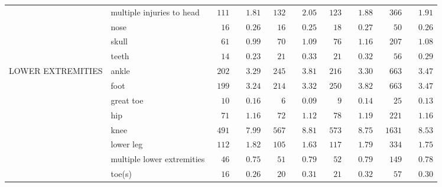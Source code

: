 \documentclass[9pt, oneside]{article}   	%
\begin{document}
\begin{longtable}{p{1.8in}p{2.2in}cccccccc}
 & multiple injuries to head  & $\phantom{0}111$ & $\phantom{00}1.81$ & $\phantom{0}132$ & $\phantom{00}2.05$ & $\phantom{0}123$ & $\phantom{00}1.88$ & $\phantom{00}366$ & $\phantom{00}1.91$ \\
 & nose  & $\phantom{00}16$ & $\phantom{00}0.26$ & $\phantom{00}16$ & $\phantom{00}0.25$ & $\phantom{00}18$ & $\phantom{00}0.27$ & $\phantom{000}50$ & $\phantom{00}0.26$ \\
 & skull  & $\phantom{00}61$ & $\phantom{00}0.99$ & $\phantom{00}70$ & $\phantom{00}1.09$ & $\phantom{00}76$ & $\phantom{00}1.16$ & $\phantom{00}207$ & $\phantom{00}1.08$ \\
 & teeth  & $\phantom{00}14$ & $\phantom{00}0.23$ & $\phantom{00}21$ & $\phantom{00}0.33$ & $\phantom{00}21$ & $\phantom{00}0.32$ & $\phantom{000}56$ & $\phantom{00}0.29$ \\
LOWER EXTREMITIES & ankle  & $\phantom{0}202$ & $\phantom{00}3.29$ & $\phantom{0}245$ & $\phantom{00}3.81$ & $\phantom{0}216$ & $\phantom{00}3.30$ & $\phantom{00}663$ & $\phantom{00}3.47$ \\
 & foot  & $\phantom{0}199$ & $\phantom{00}3.24$ & $\phantom{0}214$ & $\phantom{00}3.32$ & $\phantom{0}250$ & $\phantom{00}3.82$ & $\phantom{00}663$ & $\phantom{00}3.47$ \\
 & great toe  & $\phantom{00}10$ & $\phantom{00}0.16$ & $\phantom{000}6$ & $\phantom{00}0.09$ & $\phantom{000}9$ & $\phantom{00}0.14$ & $\phantom{000}25$ & $\phantom{00}0.13$ \\
 & hip  & $\phantom{00}71$ & $\phantom{00}1.16$ & $\phantom{00}72$ & $\phantom{00}1.12$ & $\phantom{00}78$ & $\phantom{00}1.19$ & $\phantom{00}221$ & $\phantom{00}1.16$ \\
 & knee  & $\phantom{0}491$ & $\phantom{00}7.99$ & $\phantom{0}567$ & $\phantom{00}8.81$ & $\phantom{0}573$ & $\phantom{00}8.75$ & $\phantom{0}1631$ & $\phantom{00}8.53$ \\
 & lower leg  & $\phantom{0}112$ & $\phantom{00}1.82$ & $\phantom{0}105$ & $\phantom{00}1.63$ & $\phantom{0}117$ & $\phantom{00}1.79$ & $\phantom{00}334$ & $\phantom{00}1.75$ \\
 & multiple lower extremities  & $\phantom{00}46$ & $\phantom{00}0.75$ & $\phantom{00}51$ & $\phantom{00}0.79$ & $\phantom{00}52$ & $\phantom{00}0.79$ & $\phantom{00}149$ & $\phantom{00}0.78$ \\
 & toe(s)  & $\phantom{00}16$ & $\phantom{00}0.26$ & $\phantom{00}20$ & $\phantom{00}0.31$ & $\phantom{00}21$ & $\phantom{00}0.32$ & $\phantom{000}57$ & $\phantom{00}0.30$ \\

\end{longtable}
\end{document}
